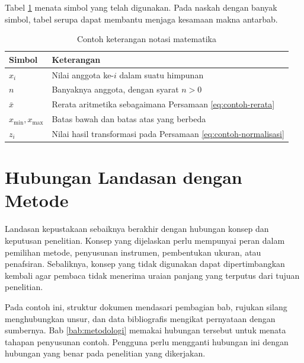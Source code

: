 Tabel \ref{tab:contoh-notasi} menata simbol yang telah digunakan. Pada naskah dengan banyak simbol, tabel serupa dapat membantu menjaga kesamaan makna antarbab.

\begin{table}[htbp]
  \centering
  \caption{Contoh keterangan notasi matematika}
  \label{tab:contoh-notasi}
  \begin{tabular}{lp{9.8cm}}
    \toprule
    Simbol & Keterangan \\
    \midrule
    $x_i$ & Nilai anggota ke-$i$ dalam suatu himpunan \\
    $n$ & Banyaknya anggota, dengan syarat $n>0$ \\
    $\bar{x}$ & Rerata aritmetika sebagaimana Persamaan \ref{eq:contoh-rerata} \\
    $x_{\min},x_{\max}$ & Batas bawah dan batas atas yang berbeda \\
    $z_i$ & Nilai hasil transformasi pada Persamaan \ref{eq:contoh-normalisasi} \\
    \bottomrule
  \end{tabular}
\end{table}

\section{Hubungan Landasan dengan Metode}

Landasan kepustakaan sebaiknya berakhir dengan hubungan konsep dan keputusan penelitian. Konsep yang dijelaskan perlu mempunyai peran dalam pemilihan metode, penyusunan instrumen, pembentukan ukuran, atau penafsiran. Sebaliknya, konsep yang tidak digunakan dapat dipertimbangkan kembali agar pembaca tidak menerima uraian panjang yang terputus dari tujuan penelitian.

Pada contoh ini, struktur dokumen mendasari pembagian bab, rujukan silang menghubungkan unsur, dan data bibliografis mengikat pernyataan dengan sumbernya. Bab \ref{bab:metodologi} memakai hubungan tersebut untuk menata tahapan penyusunan contoh. Pengguna perlu mengganti hubungan ini dengan hubungan yang benar pada penelitian yang dikerjakan.
